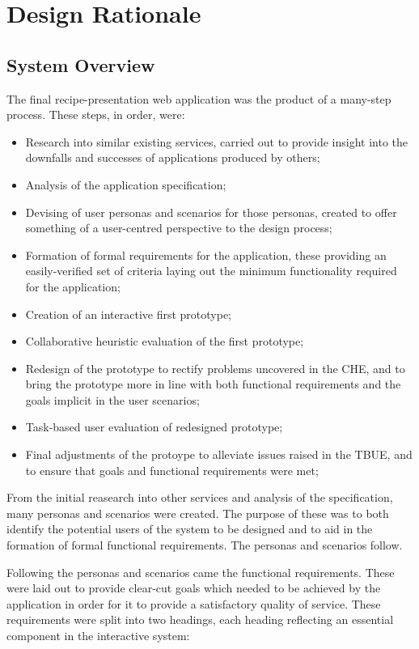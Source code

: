 \section{Design Rationale}

\subsection{System Overview}
The final recipe-presentation web application was the product of a many-step process. These steps, in order, were:
\begin{itemize}
  \item Research into similar existing services, carried out to provide insight into the downfalls and successes of applications produced by others;
  \item Analysis of the application specification;
  \item Devising of user personas and scenarios for those personas, created to offer something of a user-centred perspective to the design process;
  \item Formation of formal requirements for the application, these providing an easily-verified set of criteria laying out the minimum functionality required for the application;
  \item Creation of an interactive first prototype;
  \item Collaborative heuristic evaluation of the first prototype;
  \item Redesign of the prototype to rectify problems uncovered in the CHE, and to bring the prototype more in line with both functional requirements and the goals implicit in the user scenarios;
  \item Task-based user evaluation of redesigned prototype;
  \item Final adjustments of the protoype to alleviate issues raised in the TBUE, and to ensure that goals and functional requirements were met;
\end{itemize}

From the initial reasearch into other services and analysis of the specification, many personas and scenarios were created. The purpose of these was to both identify the potential users of the system to be designed and to aid in the formation of formal functional requirements. The personas and scenarios follow.

Following the personas and scenarios came the functional requirements. These were laid out to provide clear-cut goals which needed to be achieved by the application in order for it to provide a satisfactory quality of service. These requirements were split into two headings, each heading reflecting an essential component in the interactive system:

